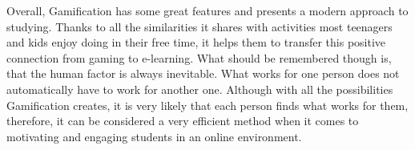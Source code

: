 \documentclass[10pt,english,a4paper]{article}
\begin{document}
	Overall, Gamification has some great features and presents a modern approach to studying. 
	Thanks to all the similarities it shares with activities most teenagers and kids enjoy doing in their free time, it helps them to transfer this positive connection from gaming to e-learning. 
	What should be remembered though is, that the human factor is always inevitable. What works for one person does not automatically have to work for another one.
	Although with all the possibilities Gamification creates, it is very likely that each person finds what works for them, therefore, it can be considered a very efficient method when it comes to motivating and engaging students in an online environment.



\end{document}
